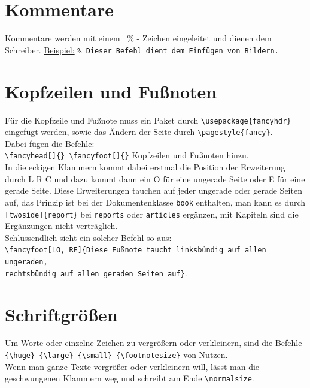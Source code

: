 \documentclass[ngerman]{scrreport}
\begin{document}
\section{Kommentare}
Kommentare werden mit einem {\color{blue}\ \%} - Zeichen eingeleitet und dienen dem Schreiber.
\newline
\underline{Beispiel:} {\color{blue}\verb|% Dieser Befehl dient dem Einfügen von Bildern.|}

\section{Kopfzeilen und Fußnoten}
Für die Kopfzeile und Fußnote muss ein Paket durch {\color{blue}\verb|\usepackage{fancyhdr}|} eingefügt werden, sowie das Ändern der Seite durch {\color{blue}\verb|\pagestyle{fancy}|}.\\
Dabei fügen die Befehle:\\
{\color{blue}\verb|\fancyhead[]{} \fancyfoot[]{}|} Kopfzeilen und Fußnoten hinzu.\\
In die eckigen Klammern kommt dabei erstmal die Position der Erweiterung durch {\color{blue}L R C} und dazu kommt dann ein {\color{blue}O} für eine ungerade Seite oder {\color{blue}E} für eine gerade Seite.
Diese Erweiterungen tauchen auf jeder ungerade oder gerade Seiten auf, das Prinzip ist bei der Dokumentenklasse \texttt{book} enthalten, man kann es durch {\color{blue}\verb|[twoside]{report}|} bei \texttt{reports} oder \texttt{articles} ergänzen, mit Kapiteln sind die Ergänzungen  nicht verträglich.\\
Schlussendlich sieht ein solcher Befehl so aus:\\
{\color{blue}\verb|\fancyfoot[LO, RE]{Diese Fußnote taucht linksbündig auf allen ungeraden,|}\\
{\color{blue}\verb|rechtsbündig auf allen geraden Seiten auf}|}.

\section{Schriftgrößen}
Um Worte oder einzelne Zeichen zu vergrößern oder verkleinern, sind die Befehle {\color{blue}\verb|{\huge} {\large} {\small} {\footnotesize}|} von Nutzen.\\
Wenn man ganze Texte vergrößer oder verkleinern will, lässt man die geschwungenen Klammern weg und schreibt am Ende {\color{blue}\verb|\normalsize|}.
\end{document}
